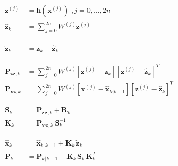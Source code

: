 \begin{equation*}
    \begin{aligned}
        \mathbf{z}^{(j)} &= \mathbf{h} \left( \mathbf{x}^{(j)} \right) \; , j=0,\dots,2n \\
        \hat{\mathbf{z}}_k &= \sum_{j=0}^{2n} W^{(j)} \mathbf{z}^{(j)} \\
        \phantom{X} \\
        \tilde{\mathbf{z}}_k &= \mathbf{z}_k - \hat{\mathbf{z}}_k \\
        \phantom{X} \\
        \mathbf{P}_{\mathbf{zz},k} &= \sum_{j=0}^{2n} W^{(j)} \left[ \mathbf{z}^{(j)} - \hat{\mathbf{z}}_k \right] \left[ \mathbf{z}^{(j)} - \hat{\mathbf{z}}_k \right]^T \\
        \mathbf{P}_{\mathbf{xz},k} &= \sum_{j=0}^{2n} W^{(j)} \left[ \mathbf{x}^{(j)} - \hat{\mathbf{x}}_{k|k-1} \right] \left[ \mathbf{z}^{(j)} - \hat{\mathbf{z}}_k \right]^T \\
        \phantom{X} \\
        \mathbf{S}_{k} &= \mathbf{P}_{\mathbf{zz},k} + \mathbf{R}_{k} \\
        \mathbf{K}_{k} &= \mathbf{P}_{\mathbf{xz},k} \; \mathbf{S}_{k}^{-1} \\
        \phantom{X} \\
        \hat{\mathbf{x}}_{k} &= \hat{\mathbf{x}}_{k|k-1} +\mathbf{K}_k \, \tilde{\mathbf{z}}_k \\
        \mathbf{P}_{k} &= \mathbf{P}_{k|k-1} - \mathbf{K}_k \, \mathbf{S}_k \, \mathbf{K}_k^T
    \end{aligned}
\end{equation*}


